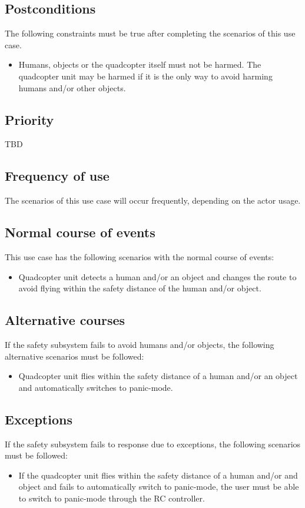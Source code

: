 \documentclass[a4paper]{article}
\begin{document}
\subsection{Postconditions}
The following constraints must be true after completing the scenarios of this use case.
\begin{itemize}
\item Humans, objects or the quadcopter itself must not be harmed. The quadcopter unit may be harmed if it is the only way to avoid harming humans and/or other objects.
\end{itemize}
\subsection{Priority}
TBD
\subsection{Frequency of use}
The scenarios of this use case will occur frequently, depending on the actor usage.
\subsection{Normal course of events}
This use case has the following scenarios with the normal course of events:
\begin{itemize}
\item Quadcopter unit detects a human and/or an object and changes the route to avoid flying within the safety distance of the human and/or object.
\end{itemize}
\subsection{Alternative courses}
If the safety subsystem fails to avoid humans and/or objects, the following alternative scenarios must be followed:
\begin{itemize}
\item Quadcopter unit flies within the safety distance of a human and/or an object and automatically switches to panic-mode.
\end{itemize}
\subsection{Exceptions}
If the safety subsystem fails to response due to exceptions, the following scenarios must be followed:
\begin{itemize}
\item If the quadcopter unit flies within the safety distance of a human and/or and object and fails to automatically switch to panic-mode, the user must be able to switch to panic-mode through the RC controller.
\end{itemize}
\end{document}
